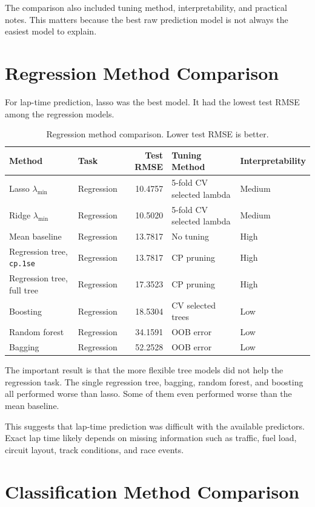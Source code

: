 \documentclass[11pt,oneside,openany]{book}
\begin{document}
The comparison also included tuning method, interpretability, and practical notes. This matters because the best raw prediction model is not always the easiest model to explain.

\section{Regression Method Comparison}

For lap-time prediction, lasso was the best model. It had the lowest test RMSE among the regression models.

\begin{table}[H]
\centering
\small
\caption{Regression method comparison. Lower test RMSE is better.}
\begin{tabular}{llrll}
\toprule
Method & Task & Test RMSE & Tuning Method & Interpretability\\
\midrule
Lasso \(\lambda_{\min}\) & Regression & 10.4757 & 5-fold CV selected lambda & Medium\\
Ridge \(\lambda_{\min}\) & Regression & 10.5020 & 5-fold CV selected lambda & Medium\\
Mean baseline & Regression & 13.7817 & No tuning & High\\
Regression tree, \texttt{cp.1se} & Regression & 13.7817 & CP pruning & High\\
Regression tree, full tree & Regression & 17.3523 & CP pruning & High\\
Boosting & Regression & 18.5304 & CV selected trees & Low\\
Random forest & Regression & 34.1591 & OOB error & Low\\
Bagging & Regression & 52.2528 & OOB error & Low\\
\bottomrule
\end{tabular}
\end{table}

The important result is that the more flexible tree models did not help the regression task. The single regression tree, bagging, random forest, and boosting all performed worse than lasso. Some of them even performed worse than the mean baseline.

This suggests that lap-time prediction was difficult with the available predictors. Exact lap time likely depends on missing information such as traffic, fuel load, circuit layout, track conditions, and race events.

\section{Classification Method Comparison}
\end{document}

